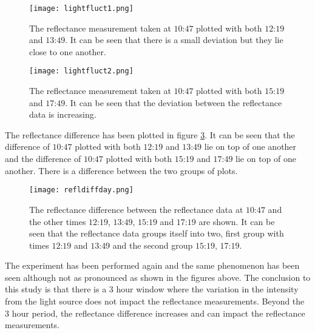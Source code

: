 \documentclass[MasterThesisMain.tex]{subfiles}
\begin{document}
\begin{figure}
\centering
\texttt{[image: lightfluct1.png]}
\caption{The reflectance measurement taken at $10$:$47$ plotted with both $12$:$19$ and $13$:$49$. It can be seen that there is a small deviation but they lie close to one another.}
\label{fig:day1}
\end{figure}

\begin{figure}
\centering
\texttt{[image: lightfluct2.png]}
\caption{The reflectance measurement taken at $10$:$47$ plotted with both $15$:$19$ and $17$:$49$. It can be seen that the deviation between the reflectance data is increasing.}
\label{fig:day2}
\end{figure}

The reflectance difference has been plotted in figure \ref{fig:day3}. It can be seen that the difference of $10$:$47$ plotted with both $12$:$19$ and $13$:$49$ lie on top of one another and the difference of $10$:$47$ plotted with both $15$:$19$ and $17$:$49$ lie on top of one another. There is a difference between the two groups of plots.

\begin{figure}
\centering
\texttt{[image: refldiffday.png]}
\caption{The reflectance difference between the reflectance data at $10$:$47$ and the other times $12$:$19$, $13$:$49$, $15$:$19$ and $17$:$19$ are shown. It can be seen that the reflectance data groups itself into two, first group with times $12$:$19$ and $13$:$49$ and the second group $15$:$19$, $17$:$19$.}
\label{fig:day3}
\end{figure}
\pagebreak
The experiment has been performed again and the same phenomenon has been seen although not as pronounced as shown in the figures above. The conclusion to this study is that there is a $3$ hour window where the variation in the intensity from the light source does not impact the reflectance measurements. Beyond the $3$ hour period, the reflectance difference increases and can impact the reflectance measurements.

	
\end{document}
